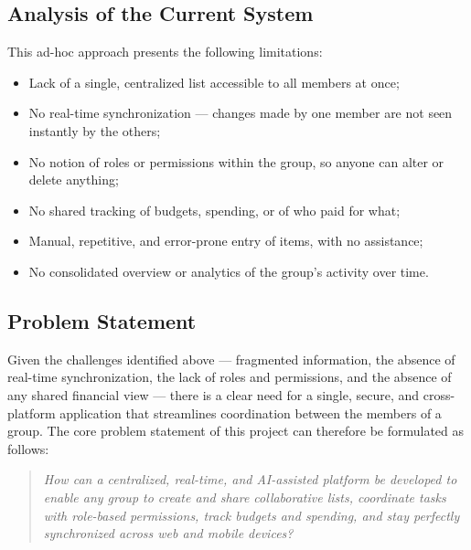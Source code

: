 \documentclass[12pt,a4paper,oneside]{report}
\begin{document}
\subsection{Analysis of the Current System}
This ad-hoc approach presents the following limitations:
\begin{itemize}[nosep]
  \item Lack of a single, centralized list accessible to all members at once;
  \item No real-time synchronization --- changes made by one member are not seen
        instantly by the others;
  \item No notion of roles or permissions within the group, so anyone can alter
        or delete anything;
  \item No shared tracking of budgets, spending, or of who paid for what;
  \item Manual, repetitive, and error-prone entry of items, with no assistance;
  \item No consolidated overview or analytics of the group's activity over time.
\end{itemize}

\subsection{Problem Statement}
Given the challenges identified above --- fragmented information, the absence of
real-time synchronization, the lack of roles and permissions, and the absence of
any shared financial view --- there is a clear need for a single, secure, and
cross-platform application that streamlines coordination between the members of a
group. The core problem statement of this project can therefore be formulated as
follows:

\begin{quote}\itshape
How can a centralized, real-time, and AI-assisted platform be developed to enable
any group to create and share collaborative lists, coordinate tasks with
role-based permissions, track budgets and spending, and stay perfectly
synchronized across web and mobile devices?
\end{quote}
\end{document}
